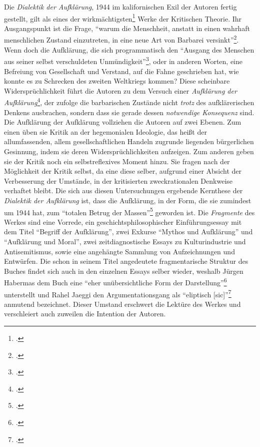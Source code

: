 \documentclass[a4paper, 12pt]{article}
\begin{document}
\begin{onehalfspace}
\noindent Die \emph{Dialektik der Aufklärung}, 1944 im kalifornischen Exil der Autoren fertig gestellt, gilt als eines der wirkmächtigsten\footnote{\Cite[Vgl.][S. 249]{jaeggi}.} Werke der Kritischen Theorie. Ihr Ausgangspunkt ist die Frage, "`warum die Menschheit, anstatt in einen wahrhaft menschlichen Zustand einzutreten, in eine neue Art von Barbarei versinkt"'\footnote{\Cite[Siehe][S. 1]{dialektik-der-aufklaerung}.}. Wenn doch die Aufklärung, die sich programmatisch den "`Ausgang des Menschen aus seiner selbst verschuldeten Unmündigkeit"'\footnote{\Cite[Siehe][S. 481]{kant}.}, oder in anderen Worten, eine Befreiung von Gesellschaft und Verstand, auf die Fahne geschrieben hat, wie konnte es zu Schrecken des zweiten Weltkriegs kommen? Diese scheinbare Widersprüchlichkeit führt die Autoren zu dem Versuch einer \emph{Aufklärung der Aufklärung}\footnote{\Cite[Vgl.][S. 406]{habermas}.}, der zufolge die barbarischen Zustände nicht \emph{trotz} des aufklärerischen Denkens ausbrachen, sondern dass sie gerade dessen \emph{notwendige Konsequenz} sind. Die Aufklärung der Aufklärung vollziehen die Autoren auf zwei Ebenen. Zum einen üben sie Kritik an der hegemonialen Ideologie, das heißt der allumfassenden, allem gesellschaftlichen Handeln zugrunde liegenden bürgerlichen Gesinnung, indem sie deren Widersprüchlichkeiten aufzeigen. Zum anderen geben sie der Kritik noch ein selbstreflexives Moment hinzu. Sie fragen nach der Möglichkeit der Kritik selbst, da eine diese selber, aufgrund einer Absicht der Verbesserung der Umstände, in der kritisierten zweckrationalen Denkweise verhaftet bleibt. Die sich aus diesen Untersuchungen ergebende Kernthese der \emph{Dialektik der Aufklärung} ist, dass die Aufklärung, in der Form, die sie zumindest um 1944 hat, zum "`totalen Betrug der Massen"'\footnote{\Cite[Siehe][S. 49]{dialektik-der-aufklaerung}.} geworden ist. Die \emph{Fragmente} des Werkes sind eine Vorrede, ein geschichtsphilosophischer Einführungsessay mit dem Titel "`Begriff der Aufklärung"', zwei Exkurse "`Mythos und Aufklärung"' und "`Aufklärung und Moral"', zwei zeitdiagnostische Essays zu Kulturindustrie und Antisemitismus, sowie eine angehängte Sammlung von Aufzeichnungen und Entwürfen. Die schon in seinem Titel angedeutete fragmentarische Struktur des Buches findet sich auch in den einzelnen Essays selber wieder, weshalb Jürgen Habermas dem Buch eine "`eher unübersichtliche Form der Darstellung"'\footnote{\Cite[Siehe][S. 406]{habermas}.} unterstellt und Rahel Jaeggi den Argumentationsgang als "`eliptisch [sic]"'\footnote{\Cite[Siehe][S. 250]{jaeggi}.} anmutend bezeichnet. Dieser Umstand erschwert die Lektüre des Werkes und verschleiert auch zuweilen die Intention der Autoren.


\end{onehalfspace}
\end{document}
